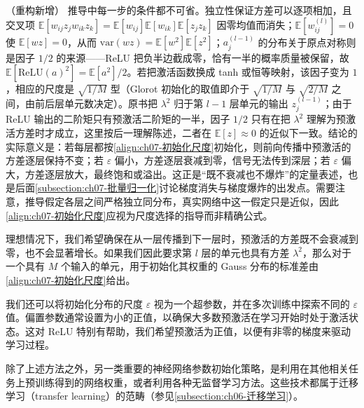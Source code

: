 \documentclass[../../main.tex]{subfiles}
\begin{document}
\begin{remark}（重构新增）
推导中每一步的条件都不可省。独立性保证方差可以逐项相加，且交叉项 $\mathbb{E}[w_{ij}z_jw_{ik}z_k]=\mathbb{E}[w_{ij}]\mathbb{E}[w_{ik}]\mathbb{E}[z_jz_k]$ 因零均值而消失；$\mathbb{E}[w_{ij}^{(l)}]=0$ 使 $\mathbb{E}[wz]=0$，从而 $\mathrm{var}(wz)=\mathbb{E}[w^{2}]\mathbb{E}[z^{2}]$；$a_j^{(l-1)}$ 的分布关于原点对称则是因子 $1/2$ 的来源——ReLU 把负半边截成零，恰有一半的概率质量被保留，故 $\mathbb{E}[\mathrm{ReLU}(a)^{2}]=\mathbb{E}[a^{2}]/2$。若把激活函数换成 tanh 或恒等映射，该因子变为 $1$，相应的尺度是 $\sqrt{1/M}$ 型（Glorot 初始化的取值即介于 $\sqrt{1/M}$ 与 $\sqrt{2/M}$ 之间，由前后层单元数决定）。原书把 $\lambda^{2}$ 归于第 $l-1$ 层单元的输出 $z_j^{(l-1)}$；由于 ReLU 输出的二阶矩只有预激活二阶矩的一半，因子 $1/2$ 只有在把 $\lambda^{2}$ 理解为预激活方差时才成立，这里按后一理解陈述，二者在 $\mathbb{E}[z]\approx0$ 的近似下一致。结论的实际意义是：若每层都按\eqref{align:ch07-初始化尺度}初始化，则前向传播中预激活的方差逐层保持不变；若 $\varepsilon$ 偏小，方差逐层衰减到零，信号无法传到深层；若 $\varepsilon$ 偏大，方差逐层放大，最终饱和或溢出。这正是“既不衰减也不爆炸”的定量表述，也是后面\cref{subsection:ch07-批量归一化}讨论梯度消失与梯度爆炸的出发点。需要注意，推导假定各层之间严格独立同分布，真实网络中这一假定只是近似，因此\eqref{align:ch07-初始化尺度}应视为尺度选择的指导而非精确公式。
\end{remark}

理想情况下，我们希望确保在从一层传播到下一层时，预激活的方差既不会衰减到零，也不会显著增长。如果我们因此要求第 $l$ 层的单元也具有方差 $\lambda^{2}$，那么对于一个具有 $M$ 个输入的单元，用于初始化其权重的 Gauss 分布的标准差由\eqref{align:ch07-初始化尺度}给出。

我们还可以将初始化分布的尺度 $\varepsilon$ 视为一个超参数，并在多次训练中探索不同的 $\varepsilon$ 值。偏置参数通常设置为小的正值，以确保大多数预激活在学习开始时处于激活状态。这对 ReLU 特别有帮助，我们希望预激活为正值，以便有非零的梯度来驱动学习过程。

除了上述方法之外，另一类重要的神经网络参数初始化策略，是利用在其他相关任务上预训练得到的网络权重，或者利用各种无监督学习方法。这些技术都属于迁移学习（transfer learning）的范畴（参见\cref{subsection:ch06-迁移学习}）。
\end{document}
